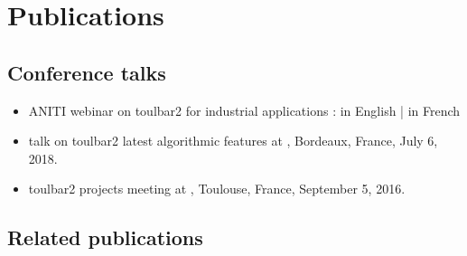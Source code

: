 \documentclass[letterpaper,10pt,openany,oneside,english]{sphinxmanual}
\begin{document}
\sphinxstepscope


\chapter{Publications}
\label{\detokenize{publications:publications}}\label{\detokenize{publications:id1}}\label{\detokenize{publications::doc}}

\section{Conference talks}
\label{\detokenize{publications:conference-talks}}\begin{itemize}
\item {} 
\sphinxAtStartPar
ANITI webinar on toulbar2 for industrial applications :
 in English |
 in French

\item {} 
\sphinxAtStartPar
talk on toulbar2 latest algorithmic features at , Bordeaux, France, July 6, 2018.

\item {} 
\sphinxAtStartPar
toulbar2 projects meeting at , Toulouse, France, September 5, 2016.

\end{itemize}


\section{Related publications}
\label{\detokenize{publications:related-publications}}
\end{document}
